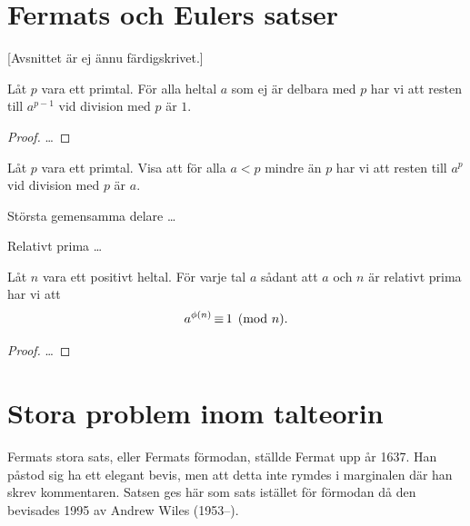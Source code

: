 \section{Fermats och Eulers satser}\label{sec:fermateuler}
[Avsnittet är ej ännu färdigskrivet.]

\begin{theorem}
  Låt \(p\) vara ett primtal.
  För alla heltal \(a\) som ej är delbara med \(p\) har vi att resten till 
  \(a^{p-1}\) vid division med \(p\) är \(1\).
\end{theorem}
\begin{proof}
  \dots
\end{proof}

\begin{exercise}
  Låt \(p\) vara ett primtal.
  Visa att för alla \(a < p\) mindre än \(p\) har vi att resten till \(a^p\) 
  vid division med \(p\) är \(a\).
\end{exercise}

\begin{definition}
  Största gemensamma delare \dots
\end{definition}
\begin{definition}
  Relativt prima \dots
\end{definition}

\begin{theorem}
  Låt \(n\) vara ett positivt heltal.
  För varje tal \(a\) sådant att \(a\) och \(n\) är relativt prima har vi att 
  \[ a^{\phi(n)} \operatorname{\equiv} 1 \pmod n. \]
\end{theorem}
\begin{proof}
  \dots
\end{proof}


\section{Stora problem inom talteorin}

Fermats stora sats, eller Fermats förmodan, ställde Fermat upp år 1637.
Han påstod sig ha ett elegant bevis, men att detta inte rymdes i marginalen där 
han skrev kommentaren.
Satsen ges här som sats istället för förmodan då den bevisades 1995 av Andrew 
Wiles (1953--).

